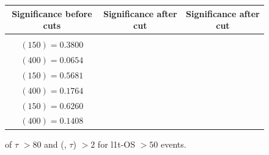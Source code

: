 \documentclass[letterpaper,12pt]{article}
\begin{document}
\begin{figure}[h!]
{  }
  \makebox[\textwidth][c]{%
    \rule{0pt}{0.6cm}
    }
  \tiny
  \setlength{\tabcolsep}{20pt}
  \renewcommand{\arraystretch}{1.6}
  \begin{tabular}{|c|c|c|}
    \hline
    Significance before cuts & Significance after \pt{} cut & Significance after \DeltaR{} cut\\
    \hline
    \Gape[0.2cm]{\makecell{
        \sig{} $(100) = 0.2990$\\
        \sig{} $(150) = 0.3800$\\
        \sig{} $(400) = 0.0654$ }} & 
    \makecell{
      \sig{} $(100) = 0.2305$\\
      \sig{} $(150) = 0.5681$\\
      \sig{} $(400) = 0.1764$} & 
    \makecell{
      \sig{} $(100) = 0.3032$\\
      \sig{} $(150) = 0.6260$\\
      \sig{} $(400) = 0.1408$}\\
    \hline
  \end{tabular}
  \caption[\2l1t-OS Cut-4: \pt{} of $\tau$ $>80$ + \DeltaR{} (\ls, $\tau$) $>2$]{\pt{} of $\tau$ $>80$ and \DeltaR{} (\ls, $\tau$) $>2$ for \2l1t-OS \metpt $>50$ events.}
  \label{fig:2l1tc4}
  \vspace{4cm}
\end{figure}
\end{document}
